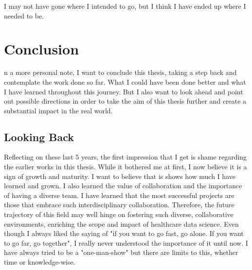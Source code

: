 

\begin{savequote}[75mm]
I may not have gone where I intended to go,
but I think I have ended up where I needed to be.

\end{savequote}

\chapter{Conclusion} \label{chap:conclusion}
n a more personal note, I want to conclude this thesis, taking a step back and contemplate the work done so far. What I could have been done better and what I have learned throughout this journey.
But I also want to look ahead and point out possible directions in order to take the aim of this thesis further and create a substantial impact in the real world.

\section{Looking Back}
Reflecting on these last 5 years, the first impression that I get is shame regarding the earlier works in this thesis. While it bothered me at first, I now believe it is a sign of growth and maturity. I want to believe that is shows how much I have learned and grown. I also learned the value of collaboration and the importance of having a diverse team. I have learned that the most successful projects are those that embrace such interdisciplinary collaboration. Therefore, the future trajectory of this field may well hinge on fostering such diverse, collaborative environments, enriching the scope and impact of healthcare data science. Even though I always liked the saying of "if you want to go fast, go alone. If you want to go far, go together", I really never understood the importance of it until now. I have always tried to be a "one-man-show" but there are limits to this, whether time or knowledge-wise. \\

